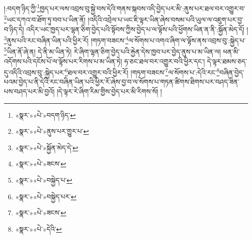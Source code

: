 །:བདག་ཉིད་ཀྱི་\footnote{«སྣར་»«པེ་»བདག་ཉིད་}ཁྱད་པར་ལས་འབྲས་བུ་སྐྱེ་བས་དེའི་གནས་སྐབས་འདི་བྱེད་པར་མི་:ནུས་པར་ཐལ་བར་འགྱུར་བ་\footnote{«སྣར་»«པེ་»ནུས་པར་གྱུར་པ་}ཡང་དཀའ་བ་ཐོག་ཏུ་བབ་པ་ཡིན་ནོ། །འདིའི་འབྲེལ་པ་ཡང་ཇི་ལྟར་ཡིན་ཞེས་བསམ་པའི་ཡུལ་ལ་འཇུག་པར་བྱ་བ་ཉིད་དེ། འདིར་ཡང་ཁྱད་པར་ལྷན་ཅིག་བྱེད་པའི་སྟོབས་ཀྱིས་བྱེད་པ་ལ་ལྟོས་པའི་ཕྱོགས་ཡིན་ན་ནི་:སྐྱོན་མེད་དོ། །\footnote{«སྣར་»«པེ་»སྐྱོན་མེད་དེ་}ནུས་པའི་རང་བཞིན་ཡིན་པའི་ཕྱིར་རོ། །གཏག་བཟངས་\footnote{«སྣར་»«པེ་»ཟངས་}ལ་སོགས་པ་འགའ་ཞིག་ལ་ལྟོས་ནས་འབྲས་བུ་:སྐྱེད་པ་\footnote{«སྣར་»«པེ་»བསྐྱེད་པ་}ཡིན་ནོ་ཞེ་ན། དེ་ནི་མ་ཡིན་ཏེ། རེ་ཞིག་ལྷན་ཅིག་བྱེད་པའི་རྐྱེན་དེས་ཁྱབ་པར་བྱེད་ནུས་པ་མ་ཡིན་ལ། ཕན་མི་འདོགས་པའི་དངོས་པོ་ལ་ལྟོས་པར་རིགས་པ་མ་ཡིན་ཏེ། ཧ་ཅང་ཐལ་བར་འགྱུར་བའི་ཕྱིར་དང་། དེ་ལྟར་ཐམས་ཅད་དུ་འདིའི་འབྲས་བུ་:སྐྱེད་པར་\footnote{«སྣར་»«པེ་»བསྐྱེད་པར་}ཐལ་བར་འགྱུར་བའི་ཕྱིར་རོ། །གཏག་བཟངས་\footnote{«སྣར་»«པེ་»ཟངས་}ལ་སོགས་པ་:དེའི་རང་\footnote{«སྣར་»«པེ་»དེའི་}བཞིན་བྱེད་པའམ་བྱེད་པ་ནི་དེའི་རང་བཞིན་ཡིན་པའི་ཕྱིར་རོ་ཞེས་བྱ་བ་ལ་སོགས་པ་གཏན་ཚིགས་ཐིགས་པར་བཤད་ཟིན་པས་བཤད་པར་མི་བྱའོ། །དེ་ལྟར་རེ་ཞིག་རིམ་གྱིས་བྱེད་པར་མི་རིགས་སོ། །
